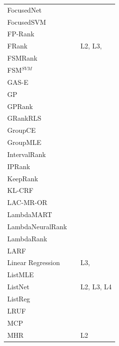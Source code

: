 \documentclass[english, authoryear, preprint]{elsarticle}
\begin{document}
\begin{table}[!hpt]
{\begin{tabular}{lll}
FocusedNet & \cite{Niu2012} & \cite{Niu2012} \\ 
FocusedSVM & \cite{Niu2012} & \cite{Niu2012} \\ 
FP-Rank & \cite{Song2013} & \cite{Song2013} \\ 
FRank & \cite{Tsai2007} & L2, L3, \cite{Wang2012} \\ 
FSMRank & \cite{Lai2013c} & \cite{Lai2013c,Laporte2013} \\ 
FSM$^{SVM}$ & \cite{Lai2013c} & \cite{Lai2013c} \\
GAS-E & \cite{Geng2007} & \cite{Lai2013c} \\ 
GP & \cite{DeAlmeida2007} & \cite{Alcantara2010} \\
GPRank & \cite{Silva2009} & \cite{Torkestani2012} \\  
GRankRLS & \cite{Pahikkala2010} & \cite{Pahikkala2010} \\
GroupCE & \cite{Lin2011} & \cite{Lin2011} \\ 
GroupMLE & \cite{Lin2010} & \cite{Lin2011} \\ 
IntervalRank & \cite{Moon2010} & \cite{Moon2010, Freno2011} \\
IPRank & \cite{Wang2009b} & \cite{Wang2009b, Torkestani2012} \\ 
KeepRank & \cite{Chen2009} & \cite{Chen2009} \\
KL-CRF & \cite{Volkovs2011} & \cite{Volkovs2011} \\ 
LAC-MR-OR & \cite{Veloso2008} & \cite{Veloso2008, Alcantara2010} \\ 
LambdaMART & \cite{Burges2010} & \cite{Asadi2013a, Ganjisaffar2011c} \\ 
LambdaNeuralRank & \cite{Papini2012} & \cite{Papini2012} \\ 
LambdaRank & \cite{Burges2006} & \cite{Papini2012, Tan2013} \\ 
LARF & \cite{Torkestani2012} & \cite{Torkestani2012} \\
Linear Regression & \cite{Cossock2006} & L3, \cite{Wang2012, Volkovs2011} \\
ListMLE & \cite{Xia2008} & \cite{Lin2010, Lin2011, Gao2014} \\
ListNet & \cite{Cao2007} & L2, L3, L4 \\
ListReg & \cite{Wu2011} & \cite{Wu2011}\\
LRUF & \cite{Torkestani2012b} & \cite{Torkestani2012b}\\
MCP & \cite{Laporte2013} & \cite{Laporte2013}\\
MHR & \cite{Qin2007} & L2\\

\end{tabular}}
\end{table}
\end{document}
